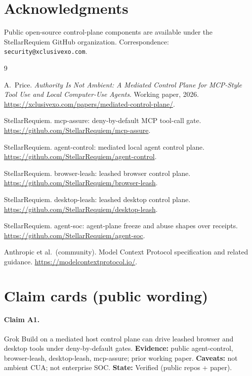 \documentclass[11pt,a4paper]{article}
\begin{document}
\section*{Acknowledgments}

Public open-source control-plane components are available under the StellarRequiem
GitHub organization. Correspondence: \texttt{security@xclusivexo.com}.

\begin{thebibliography}{9}

A.~Price.
\newblock \emph{Authority Is Not Ambient: A Mediated Control Plane for MCP-Style
Tool Use and Local Computer-Use Agents}.
\newblock Working paper, 2026.
\newblock \url{https://xclusivexo.com/papers/mediated-control-plane/}.

StellarRequiem.
\newblock mcp-assure: deny-by-default MCP tool-call gate.
\newblock \url{https://github.com/StellarRequiem/mcp-assure}.

StellarRequiem.
\newblock agent-control: mediated local agent control plane.
\newblock \url{https://github.com/StellarRequiem/agent-control}.

StellarRequiem.
\newblock browser-leash: leashed browser control plane.
\newblock \url{https://github.com/StellarRequiem/browser-leash}.

StellarRequiem.
\newblock desktop-leash: leashed desktop control plane.
\newblock \url{https://github.com/StellarRequiem/desktop-leash}.

StellarRequiem.
\newblock agent-soc: agent-plane freeze and abuse shapes over receipts.
\newblock \url{https://github.com/StellarRequiem/agent-soc}.

Anthropic et al.\ (community).
\newblock Model Context Protocol specification and related guidance.
\newblock \url{https://modelcontextprotocol.io/}.

\end{thebibliography}

\appendix

\section{Claim cards (public wording)}
\label{app:claims}

\paragraph{Claim A1.}
Grok Build on a mediated host control plane can drive leashed browser and desktop
tools under deny-by-default gates.
\textbf{Evidence:} public agent-control, browser-leash, desktop-leash, mcp-assure;
prior working paper.
\textbf{Caveats:} not ambient CUA; not enterprise SOC.
\textbf{State:} Verified (public repos + paper).
\end{document}
